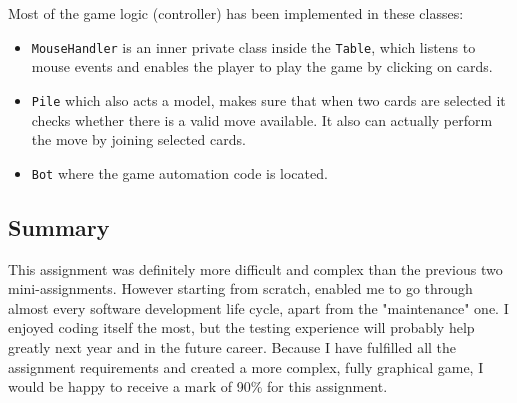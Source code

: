 \documentclass[a4paper, 11pt, titlepage]{article}
\begin{document}
Most of the game logic (controller) has been implemented in these classes:
\begin{itemize}
	\item \texttt{MouseHandler} is an inner private class inside the \texttt{Table}, 
		which listens to mouse events and enables the player to play the game by 
		clicking on cards. 
	
	\item \texttt{Pile} which also acts a model, makes sure that when two cards are 
		selected it checks whether there is a valid move available. It also can actually
		perform the move by joining selected cards.
	
	\item \texttt{Bot} where the game automation code is located. 
\end{itemize}

\subsection{Summary}
This assignment was definitely more difficult and complex than the previous two 
mini-assignments. However starting from scratch, enabled me to go through almost
every software development life cycle, apart from the "maintenance" one. I enjoyed coding
itself the most, but the testing experience will probably help greatly next year and in
the future career. Because I have fulfilled all the assignment requirements and created 
a more complex, fully graphical game, I would be happy to receive a mark of 90\% for 
this assignment.
\end{document}
